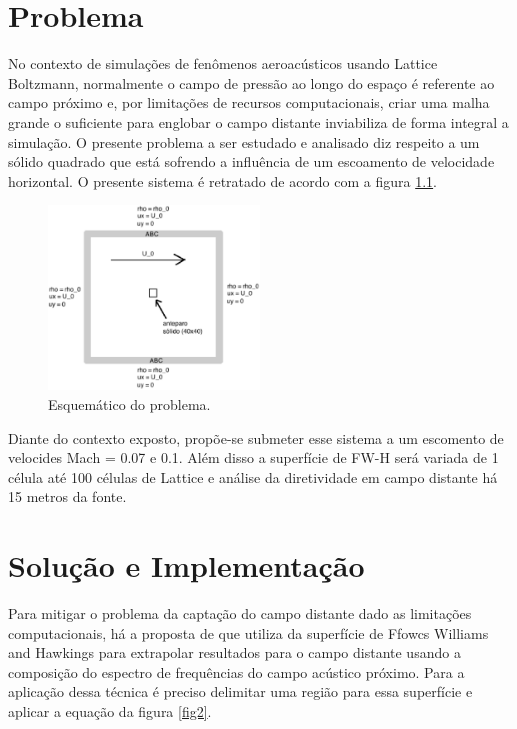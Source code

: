 \chapter{Problema}

No contexto de simulações de fenômenos aeroacústicos usando Lattice Boltzmann, normalmente o campo de pressão ao longo do espaço é referente ao campo próximo e, por limitações de recursos computacionais, criar uma malha grande o suficiente para englobar o campo distante inviabiliza de forma integral a simulação. O presente problema a ser estudado e analisado diz respeito a um sólido quadrado que está sofrendo a influência de um escoamento de velocidade horizontal. O presente sistema é retratado de acordo com a figura \ref{fig1}.

\begin{figure}[h!]
    \centering
    \hspace{-1.cm}
    \label{fig1}
    \includegraphics[width=0.5\textwidth]{../figuras/l5_1.eps}
    \caption{Esquemático do problema.}
\end{figure}

Diante do contexto exposto, propõe-se submeter esse sistema a um escomento de velocides Mach = 0.07 e 0.1. Além disso a superfície de FW-H será variada de 1 célula até 100 células de Lattice e análise da diretividade em campo distante há 15 metros da fonte.

\chapter{Solução e Implementação}

Para mitigar o problema da captação do campo distante dado as limitações computacionais, há a proposta de \cite{lockard} que utiliza da superfície de Ffowcs Williams and Hawkings para extrapolar resultados para o campo distante usando a composição do espectro de frequências do campo acústico próximo. Para a aplicação dessa técnica é preciso delimitar uma região para essa superfície e aplicar a equação da figura \ref{fig2}.

